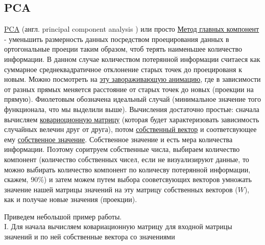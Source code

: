 \documentclass[11pt]{article}
\begin{document}
    \subsection{PCA}\label{pca}

    \href{https://en.wikipedia.org/wiki/Principal_component_analysis}{PCA}
(англ. principal component analysis ) или просто
\href{https://ru.wikipedia.org/wiki/\%D0\%9C\%D0\%B5\%D1\%82\%D0\%BE\%D0\%B4_\%D0\%B3\%D0\%BB\%D0\%B0\%D0\%B2\%D0\%BD\%D1\%8B\%D1\%85_\%D0\%BA\%D0\%BE\%D0\%BC\%D0\%BF\%D0\%BE\%D0\%BD\%D0\%B5\%D0\%BD\%D1\%82}{Метод
главных компонент} - уменьшить размерность данных посредством
проецирования данных в ортогональные проеции таким образом, чтоб терять
наименьшее количество информации. В данном случае количеством потерянной
информации считаеся как суммарное среднеквадратичное отклонение старых
точек до проецированя к новым. Можно посмотреть на
\href{https://i.stack.imgur.com/Q7HIP.gif}{эту завораживающую анимацию},
где в зависимости от разных прямых меняется расстояние от старых точек
до новых (проекции на прямую). Фиолетовым обозначена идеальный случай
(минимальное значение того функционала, что мы выделили выше).
Вычисления достаточно простые: сначала вычисляем
\href{https://en.wikipedia.org/wiki/Covariance_matrix}{ковариоционную
матрицу} (которая будет характеризовать зависимость случайных велечин
друг от друга), потом
\href{https://en.wikipedia.org/wiki/Eigenvalues_and_eigenvectors}{собственный
вектор} и соответсвующее ему
\href{https://en.wikipedia.org/wiki/Eigenvalues_and_eigenvectors}{собственное
значение}. Собственное значение и есть мера количества информации.
Поэтому соритруем собственные числа, выбираем количество компонент
(количество собственных чисел, если не визуализируют данные, то можно
выбирать количество компонент по количесву потерянной информации,
скажем, 90\%) и затем можем путем выбора сооветсвующих векторов умножать
значение нашей матрицы значений на эту матрицу собственных векторов
(\(W\)), как и получае новые значения (проекции).

    Приведем небольшой пример работы.\\
I. Для начала вычисляем ковариационную матрицу для входной матрицы
значений и по ней собственные вектора со значениями
\end{document}
